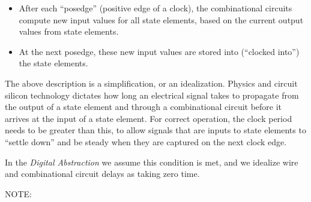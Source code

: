 \begin{itemize}

\item After each ``posedge'' (positive edge of a clock), the
      combinational circuits compute new input values for all state
      elements, based on the current output values from state elements.

\item At the next posedge, these new input values are stored into
      (``clocked into'') the state elements.

\end{itemize}

The above description is a simplification, or an idealization.
Physics and circuit silicon technology dictates how long an electrical
signal takes to propagate from the output of a state element and
through a combinational circuit before it arrives at the input of a
state element.  For correct operation, the clock period needs to be
greater than this, to allow signals that are inputs to state elements
to ``settle down'' and be steady when they are captured on the next
clock edge.


In the \emph{Digital Abstraction} we assume this condition is met, and
we idealize wire and combinational circuit delays as taking zero time.


\vspace{1ex}

NOTE: 

